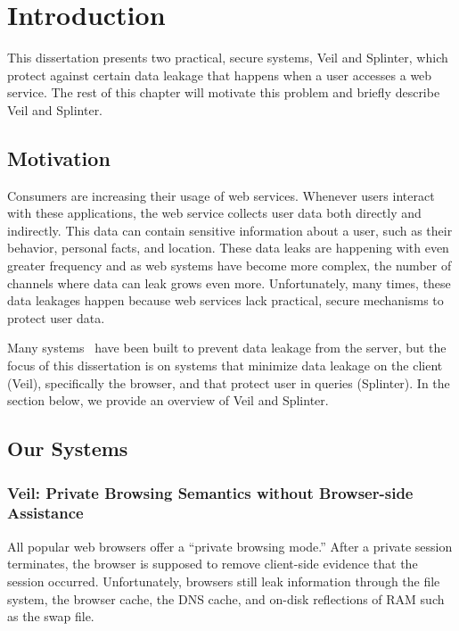 \section{Introduction}
\label{chap:intro}

This dissertation presents two practical, secure
systems, Veil and Splinter, which protect against
certain data leakage that happens when a user
accesses a web service. The rest of this
chapter will motivate this problem and 
briefly describe Veil and Splinter.

\subsection{Motivation}
Consumers are increasing their usage of web services. Whenever
users interact with these applications, the web service collects
user data both directly and indirectly. This data can contain sensitive 
information about a user, such as their behavior, personal facts,
and location. These data leaks are happening with even greater
frequency and as web systems have become more complex, the number
of channels where data can leak grows even more. Unfortunately,
many times, these data leakages happen because web services
lack practical, secure mechanisms to protect user data. 

Many systems~\cite{mylar, popa:cryptdb, opaque} 
have been built to prevent
data leakage from the server, but
the focus of this dissertation is on systems
that minimize data leakage on the client (Veil), specifically
the browser, and that protect user in queries (Splinter).
In the section below, we provide an overview of Veil and Splinter.

\subsection{Our Systems}

\subsubsection{Veil: Private Browsing Semantics without Browser-side Assistance}
All popular web browsers offer a ``private browsing
mode.'' After a private session terminates, the
browser is supposed to remove client-side
evidence that the session occurred. Unfortunately,
browsers still leak information through the file
system, the browser cache, the DNS cache, and
on-disk reflections of RAM such as the swap file.

